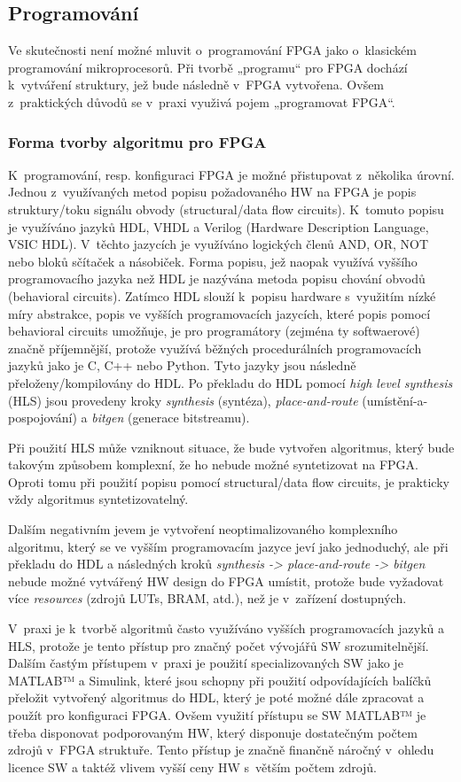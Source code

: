\documentclass[a4paper, twoside, 11pt]{article}
\begin{document}
		\subsection{Programování}
			Ve skutečnosti není možné mluvit o~programování FPGA jako o~klasickém programování mikroprocesorů. Při tvorbě „programu“ pro FPGA dochází k~vytváření struktury, jež bude následně v~FPGA vytvořena. Ovšem z~praktických důvodů se v~praxi využivá pojem „programovat FPGA“.
		\subsubsection{Forma tvorby algoritmu pro FPGA}\label{subsubsec:forma-tvorby-algoritmu-pro-fpga}
		K~programování, resp. konfiguraci FPGA je možné přistupovat z~několika úrovní. Jednou z~využívaných metod popisu požadovaného HW na FPGA je popis struktury/toku signálu obvody (structural/data flow circuits). K~tomuto popisu je využíváno jazyků HDL, VHDL a Verilog (Hardware Description Language, VSIC HDL). V~těchto jazycích je využíváno logických členů AND, OR, NOT nebo bloků sčítaček a násobiček. Forma popisu, jež naopak využívá vyššího programovacího jazyka než HDL je nazývána metoda popisu chování obvodů (behavioral circuits). Zatímco HDL slouží k~popisu hardware s~využitím nízké míry abstrakce, popis ve vyšších programovacích jazycích, které popis pomocí behavioral circuits umožňuje, je pro programátory (zejména ty softwaerové) značně příjemnější, protože využívá běžných procedurálních programovacích jazyků jako je C, C++ nebo Python. Tyto jazyky jsou následně přeloženy/kompilovány do HDL. Po překladu do HDL pomocí \textit{high level synthesis} (HLS) jsou provedeny kroky \textit{synthesis} (syntéza), \textit{place-and-route} (umístění-a-pospojování) a \textit{bitgen} (generace bitstreamu). \cite{Sass2010}\par
		Při použití HLS může vzniknout situace, že bude vytvořen algoritmus, který bude takovým způsobem komplexní, že ho nebude možné syntetizovat na FPGA. Oproti tomu při použití popisu pomocí structural/data flow circuits, je prakticky vždy algoritmus syntetizovatelný. \cite{Sass2010}\par
		Dalším negativním jevem je vytvoření neoptimalizovaného komplexního algoritmu, který se ve vyšším programovacím jazyce jeví jako jednoduchý, ale při překladu do HDL a následných kroků \textit{synthesis -> place-and-route -> bitgen} nebude možné vytvářený HW design do FPGA umístit, protože bude vyžadovat více \textit{resources} (zdrojů LUTs, BRAM, atd.), než je v~zařízení dostupných.\par
		V~praxi je k~tvorbě algoritmů často využíváno vyšších programovacích jazyků a HLS, protože je tento přístup pro značný počet vývojářů SW srozumitelnější. Dalším častým přístupem v~praxi je použití specializovaných SW jako je MATLAB™️ a Simulink, které jsou schopny při použití odpovídajících balíčků přeložit vytvořený algoritmus do HDL, který je poté možné dále zpracovat a použít pro konfiguraci FPGA. Ovšem využití přístupu se SW MATLAB™️ je třeba disponovat podporovaným HW, který disponuje dostatečným počtem zdrojů v~FPGA struktuře. Tento přístup je značně finančně náročný v~ohledu licence SW a taktéž vlivem vyšší ceny HW s~větším počtem zdrojů.
\end{document}
